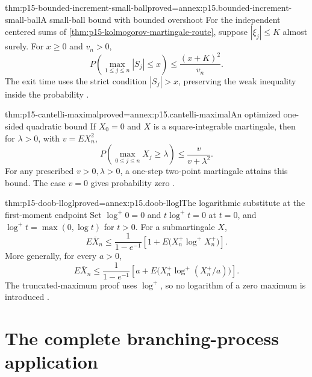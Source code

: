 \begin{hbtheorem}{thm:p15-bounded-increment-small-ball}{proved=annex:p15.bounded-increment-small-ball}{A small-ball bound with bounded overshoot}
For the independent centered sums of
\cref{thm:p15-kolmogorov-martingale-route}, suppose
\(|\xi_j|\leq K\) almost surely. For \(x\geq0\) and \(v_n>0\),
\[
                 P\left(\max_{1\leq j\leq n}|S_j|\leq x\right)
                                      \leq\frac{(x+K)^2}{v_n}.
\]
The exit time uses the strict condition \(|S_j|>x\), preserving
the weak inequality inside the probability
\cite[ex.~4.4.6]{DurrettPTEAuthor2019}.
\end{hbtheorem}

\begin{hbtheorem}{thm:p15-cantelli-maximal}{proved=annex:p15.cantelli-maximal}{An optimized one-sided quadratic bound}
If \(X_0=0\) and \(X\) is a square-integrable martingale, then for
\(\lambda>0\), with \(v=EX_n^2\),
\[
                   P\left(\max_{0\leq j\leq n}X_j\geq\lambda\right)
                                      \leq\frac{v}{v+\lambda^2}.
\]
For any prescribed \(v>0,\lambda>0\), a one-step two-point martingale
attains this bound. The case \(v=0\) gives probability zero
\cite[ex.~4.4.7]{DurrettPTEAuthor2019}.
\end{hbtheorem}

\begin{hbtheorem}{thm:p15-doob-llogl}{proved=annex:p15.doob-llogl}{The logarithmic substitute at the first-moment endpoint}
Set \(\log^+0=0\) and \(t\log^+t=0\) at \(t=0\), and
\(\log^+t=\max(0,\log t)\) for \(t>0\).
For a submartingale \(X\),
\[
      E\overline X_n
        \leq\frac1{1-e^{-1}}
                  \left[1+E\bigl(X_n^+\log^+X_n^+\bigr)\right].
\]
More generally, for every \(a>0\),
\[
      E\overline X_n
        \leq\frac1{1-e^{-1}}
                  \left[a+E\bigl(X_n^+\log^+(X_n^+/a)\bigr)\right].
\]
The truncated-maximum proof uses \(\log^+\), so no logarithm of a
zero maximum is introduced \cite[ex.~4.4.8]{DurrettPTEAuthor2019}.
\end{hbtheorem}

\section{The complete branching-process application}
\label{sec:p15-branching-second-moments}


